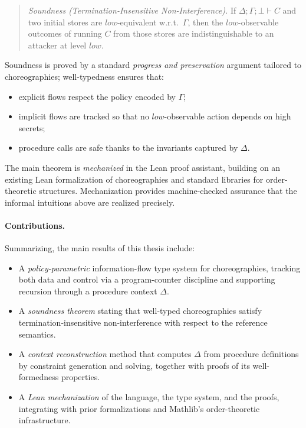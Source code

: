 \documentclass[12pt,a4paper,twoside]{book}
\begin{document}
\begin{quote}
\emph{Soundness (Termination-Insensitive Non-Interference).} If $\Delta;\Gamma;\bot \vdash C$ and two initial stores are $low$-equivalent w.r.t.\ $\Gamma$, then the $low$-observable outcomes of running $C$ from those stores are indistinguishable to an attacker at level \(low\).
\end{quote}

\noindent
Soundness is proved by a standard \emph{progress and preservation}\cite{pierce2002types} argument tailored to choreographies; well-typedness ensures that:
\begin{itemize}
\item explicit flows respect the policy encoded by $\Gamma$;
\item implicit flows are tracked so that no $low$-observable action depends on high secrets;
\item procedure calls are safe thanks to the invariants captured by $\Delta$.
\end{itemize}

The main theorem is \emph{mechanized} in the Lean proof assistant\cite{de2015lean}, building on an existing Lean formalization of choreographies and standard libraries for order-theoretic structures. Mechanization provides machine-checked assurance that the informal intuitions above are realized precisely.

\paragraph{Contributions.}
Summarizing, the main results of this thesis include:
\begin{itemize}
  \item A \emph{policy-parametric} information-flow type system for choreographies, tracking both data and control via a program-counter discipline and supporting recursion through a procedure context $\Delta$.
  \item A \emph{soundness theorem} stating that well-typed choreographies satisfy termination-insensitive non-interference with respect to the reference semantics.
  \item A \emph{context reconstruction} method that computes $\Delta$ from procedure definitions by constraint generation and solving, together with proofs of its well-formedness properties.
\item A \emph{Lean mechanization} of the language, the type system, and the proofs, integrating with prior formalizations and Mathlib's order-theoretic infrastructure\cite{mathlib4}.
\end{itemize}
\end{document}
